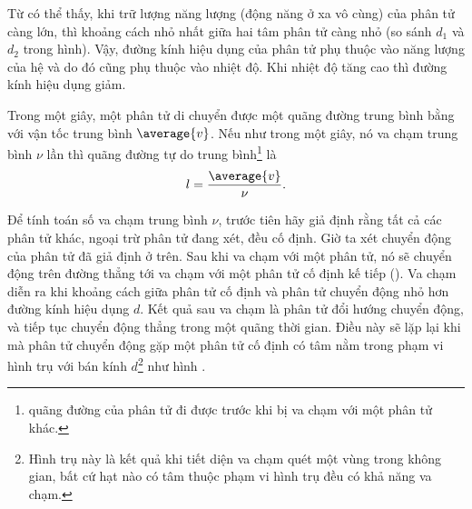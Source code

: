 Từ  có thể thấy, khi trữ lượng năng lượng (động năng ở xa vô cùng) của phân tử càng lớn, thì khoảng cách nhỏ nhất giữa hai tâm phân tử càng nhỏ (so sánh $d_1$ và $d_2$ trong hình). Vậy, đường kính hiệu dụng của phân tử phụ thuộc vào năng lượng của hệ và do đó cũng phụ thuộc vào nhiệt độ. Khi nhiệt độ tăng cao thì đường kính hiệu dụng giảm.

Trong một giây, một phân tử di chuyển được một quãng đường trung bình bằng với vận tốc trung bình $\average{v}$. Nếu như trong một giây, nó va chạm trung bình $\nu$ lần thì quãng đường tự do trung bình\footnote{quãng đường của phân tử đi được trước khi bị va chạm với một phân tử khác.} là
\begin{equation}\label{eq:16_7}
    l = \frac{\average{v}}{\nu}.
\end{equation}

Để tính toán số va chạm trung bình $\nu$, trước tiên hãy giả định rằng tất cả các phân tử khác, ngoại trừ phân tử đang xét, đều cố định. Giờ ta xét chuyển động của phân tử đã giả định ở trên. Sau khi va chạm với một phân tử, nó sẽ chuyển động trên đường thẳng tới va chạm với một phân tử cố định kế tiếp (). Va chạm diễn ra khi khoảng cách giữa phân tử cố định và phân tử chuyển động nhỏ hơn đường kính hiệu dụng $d$. Kết quả sau va chạm là phân tử đổi hướng chuyển động, và tiếp tục chuyển động thẳng trong một quãng thời gian. Điều này sẽ lặp lại khi mà phân tử chuyển động gặp một phân tử cố định có tâm nằm trong phạm vi hình trụ với bán kính $d$\footnote{Hình trụ này là kết quả khi tiết diện va chạm quét một vùng trong không gian, bất cứ hạt nào có tâm thuộc phạm vi hình trụ đều có khả năng va chạm.} như hình .

